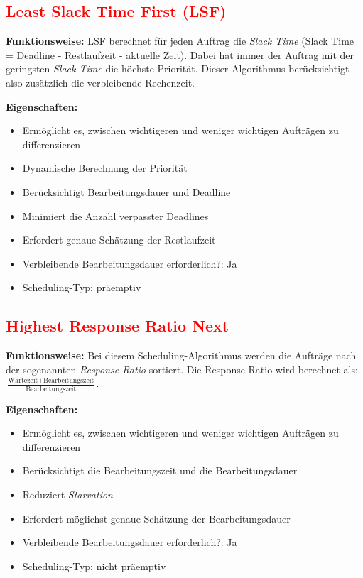 \documentclass[
    12pt,               
    a4paper,            
    ngerman,            
    parskip=half,       
    headings=normal,   
    numbers=enddot,     
    toc=chapterentrywithdots 
]{scrreprt}\usepackage[utf8]{inputenc}
\begin{document}
\subsection{\textcolor{red}{Least Slack Time First (LSF)}}
\textbf{Funktionsweise:} LSF berechnet für jeden Auftrag die \textit{Slack Time} (Slack Time = Deadline - Restlaufzeit - aktuelle Zeit). Dabei hat immer der Auftrag mit der geringsten \textit{Slack Time} die höchste Priorität. Dieser Algorithmus berücksichtigt also zusätzlich die verbleibende Rechenzeit.\citep[Vgl.][S.39ff]{salfner2010priority}

\textbf{Eigenschaften:}
\begin{itemize}
    \item[+] Ermöglicht es, zwischen wichtigeren und weniger wichtigen Aufträgen zu differenzieren
    \item[+] Dynamische Berechnung der Priorität
    \item[+] Berücksichtigt Bearbeitungsdauer und Deadline
    \item[+] Minimiert die Anzahl verpasster Deadlines
    \item[-] Erfordert genaue Schätzung der Restlaufzeit
    \item Verbleibende Bearbeitungsdauer erforderlich?: Ja
    \item Scheduling-Typ: präemptiv
\end{itemize}

\subsection{\textcolor{red}{Highest Response Ratio Next}}
\textbf{Funktionsweise:} Bei diesem Scheduling-Algorithmus werden die Aufträge nach der sogenannten \textit{Response Ratio} sortiert. Die Response Ratio wird berechnet als: $\frac{\text{Wartezeit} + \text{Bearbeitungszeit}}{\text{Bearbeitungszeit}}$.\citep[Vgl.]{simic2024hrrn}

\textbf{Eigenschaften:}
\begin{itemize}
    \item[+] Ermöglicht es, zwischen wichtigeren und weniger wichtigen Aufträgen zu differenzieren
    \item[+] Berücksichtigt die Bearbeitungszeit und die Bearbeitungsdauer
    \item[+] Reduziert \textit{Starvation}
    \item[-] Erfordert möglichst genaue Schätzung der Bearbeitungsdauer
    \item Verbleibende Bearbeitungsdauer erforderlich?: Ja
    \item Scheduling-Typ: nicht präemptiv
\end{itemize}
\end{document}
